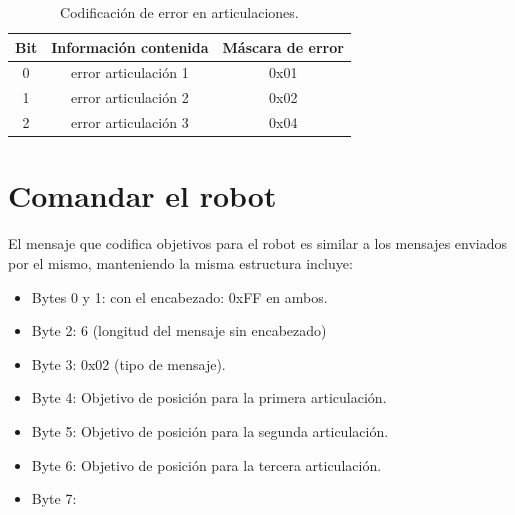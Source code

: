 \begin{table}[htbp]

\centering

\caption{Codificación de error en articulaciones.}

\label{tab:joint_error}


\begin{center}

\begin{tabular}{|c|c|c|}

\hline

\textbf{Bit} & \textbf{Información contenida} & \textbf{Máscara de error} \\

\hline

0 & error articulación 1 & 0x01 \\

\hline

1 & error articulación 2 & 0x02 \\

\hline

2 & error articulación 3 & 0x04 \\

\hline

\end{tabular}

\end{center}

\end{table}


\section{Comandar el robot}


El mensaje que codifica objetivos para el robot es similar a los mensajes enviados por el mismo, manteniendo la misma estructura incluye:

\begin{itemize}

\item Bytes 0 y 1: con el encabezado: 0xFF en ambos.

\item Byte 2: 6 (longitud del mensaje sin encabezado)

\item Byte 3: 0x02 (tipo de mensaje).

\item Byte 4: Objetivo de posición para la primera articulación.

\item Byte 5: Objetivo de posición para la segunda articulación.

\item Byte 6: Objetivo de posición para la tercera articulación.

\item Byte 7: 

\end{itemize}